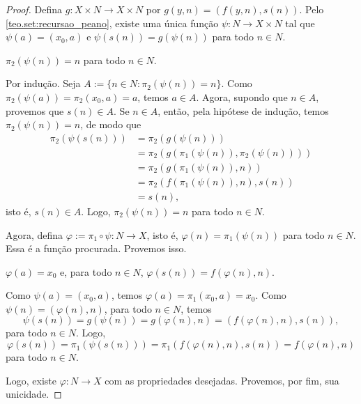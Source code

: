 \begin{proof} 
    Defina $g : X \times N \to X \times N$ por $g(y,n) = (f(y,n),s(n))$. Pelo \cref{teo.set:recursao_peano}, existe uma única função $\psi : N \to X \times N$ tal que $\psi(a) = (x_0,a)$ e $\psi(s(n)) = g(\psi(n))$ para todo $n \in N$.
        \begin{claim}
            $\pi_2(\psi(n)) = n$ para todo $n \in N$.
        \end{claim}
        \begin{midproof}
            Por indução. Seja $A := \{n \in N: \pi_2(\psi(n)) = n\}$. Como $\pi_2(\psi(a)) = \pi_2 (x_0,a) = a$, temos $a \in A$. Agora, supondo que $n \in A$, provemos que $s(n) \in A$. Se $n \in A$, então, pela hipótese de indução, temos $\pi_2(\psi(n)) = n$, de modo que
                \begin{align*}
                    \pi_2(\psi(s(n))) &= \pi_2(g(\psi(n))) \\
                    &= \pi_2(g(\pi_1(\psi(n)), \pi_2(\psi(n)))) \\
                    &= \pi_2 (g(\pi_1(\psi(n)), n)) \\
                    &= \pi_2 (f(\pi_1(\psi(n)),n),s(n)) \\
                    &= s(n),
                \end{align*}
            isto é, $s(n) \in A$. Logo, $\pi_2(\psi(n)) = n$ para todo $n \in N$. \whiteproof
        \end{midproof}
    Agora, defina $\varphi := \pi_1 \circ \psi : N \to X$, isto é, $\varphi(n) = \pi_1(\psi(n))$ para todo $n \in N$. Essa é a função procurada. Provemos isso.
        \begin{claim}
            $\varphi(a) = x_0$ e, para todo $n \in N$, $\varphi(s(n)) = f(\varphi(n), n)$.
        \end{claim}
        \begin{midproof}
            Como $\psi(a) = (x_0,a)$, temos $\varphi(a) = \pi_1(x_0, a) = x_0$. Como $\psi(n) = (\varphi(n),n)$, para todo $n \in N$, temos
                \[
                    \psi(s(n)) = g(\psi(n)) = g(\varphi(n),n) = (f(\varphi(n),n),s(n)),
                \]
            para todo $n \in N$. Logo,
                \[
                    \varphi(s(n)) = \pi_1(\psi(s(n))) = \pi_1(f(\varphi(n),n),s(n)) = f(\varphi(n),n)
                \]
            para todo $n \in N$. \whiteproof
        \end{midproof}
    Logo, existe $\varphi : N \to X$ com as propriedades desejadas. Provemos, por fim, sua unicidade.

\end{proof}
